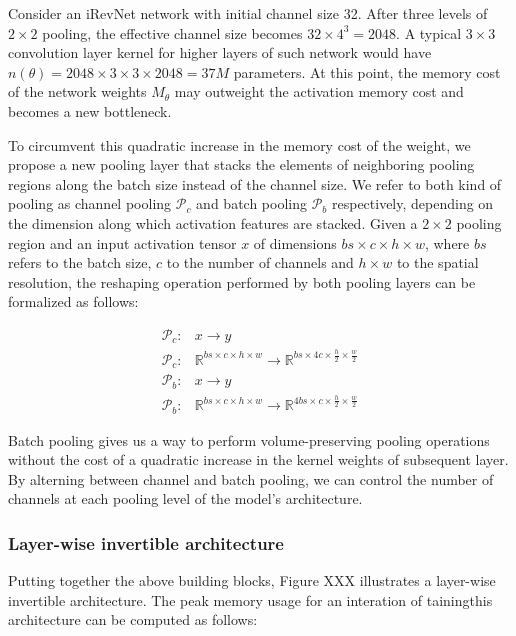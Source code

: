 \documentclass[twocolumn]{bmcart}
\begin{document}
Consider an iRevNet network with initial channel size 32.
After three levels of $2 \times 2$ pooling, the effective channel size becomes $32 \times 4^3=2048$. A typical $3 \times 3$ convolution layer kernel for higher layers of such network would have $n(\theta)=2048 \times 3 \times 3 \times 2048=37M$ parameters.
At this point, the memory cost of the network weights $M_{\theta}$ may outweight the activation memory cost and becomes a new bottleneck.

To circumvent this quadratic increase in the memory cost of the weight, we propose a new pooling layer that stacks the elements of neighboring pooling regions along the batch size instead of the channel size. We refer to both kind of pooling as channel pooling $\mathcal{P}_c$ and batch pooling $\mathcal{P}_b$ respectively, depending on the dimension along which activation features are stacked.
Given a $2 \times 2$ pooling region and an input activation tensor $x$ of dimensions $bs \times c \times h \times w$, where $bs$ refers to the batch size, $c$ to the number of channels and $h \times w$ to the spatial resolution, the reshaping operation performed by both pooling layers can be formalized as follows:

\begin{subequations}
\begin{align}
	\mathcal{P}_c :& x \rightarrow y \\
	\mathcal{P}_c :& \mathbb{R}^{bs \times c \times h \times w}  \rightarrow \mathbb{R}^{bs \times 4c \times \frac{h}{2} \times \frac{w}{2}}\\
	\mathcal{P}_b :& x \rightarrow y \\
    \mathcal{P}_b :&  \mathbb{R}^{bs \times c \times h \times w}  \rightarrow \mathbb{R}^{4bs \times c \times \frac{h}{2} \times \frac{w}{2}}
\end{align}
\end{subequations}

Batch pooling gives us a way to perform volume-preserving pooling operations without the cost of a quadratic increase in the kernel weights of subsequent layer. 
By alterning between channel and batch pooling, we can control the number of channels at each pooling level of the model's architecture.

\subsubsection{Layer-wise invertible architecture}

Putting together the above building blocks, Figure XXX illustrates a layer-wise invertible architecture.
The peak memory usage for an interation of tainingthis architecture can be computed as follows:
\end{document}
